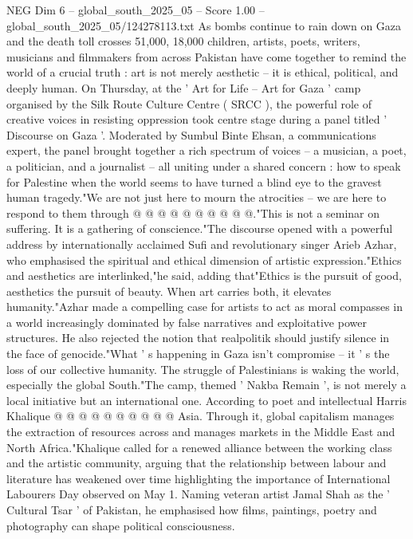 \begin{textsample}{NEG Dim 6 – global\_south\_2025\_05 – Score 1.00 – global\_south\_2025\_05/124278113.txt}  \label{ex:f6_neg_395}
As bombs continue to rain down on Gaza and the death toll crosses 51,000, 18,000 children, artists, poets, writers, musicians and filmmakers from across Pakistan have come together to remind the world of a crucial truth : art is not merely aesthetic -- it is ethical, political, and deeply human.
On Thursday, at the ' Art for Life -- Art for Gaza ' camp organised by the Silk Route Culture Centre ( SRCC ), the powerful role of creative voices in resisting oppression took centre stage during a panel titled ' Discourse on Gaza '.
Moderated by Sumbul Binte Ehsan, a communications expert, the panel brought together a rich spectrum of voices -- a musician, a poet, a politician, and a journalist -- all uniting under a shared concern : how to speak for Palestine when the world seems to have turned a blind eye to the gravest human tragedy."We are not just here to mourn the atrocities -- we are here to respond to them through @ @ @ @ @ @ @ @ @ @."This is not a seminar on suffering.
It is a gathering of conscience."The discourse opened with a powerful address by internationally acclaimed Sufi and revolutionary singer Arieb Azhar, who emphasised the spiritual and ethical dimension of artistic expression."Ethics and aesthetics are interlinked,"he said, adding that"Ethics is the pursuit of good, aesthetics the pursuit of beauty.
When art carries both, it elevates humanity."Azhar made a compelling case for artists to act as moral compasses in a world increasingly dominated by false narratives and exploitative power structures.
He also rejected the notion that realpolitik should justify silence in the face of genocide."What ' s happening in Gaza isn't compromise -- it ' s the loss of our collective humanity.
The struggle of Palestinians is waking the world, especially the global South."The camp, themed ' Nakba Remain ', is not merely a local initiative but an international one.
According to poet and intellectual Harris Khalique @ @ @ @ @ @ @ @ @ @ Asia.
Through it, global capitalism manages the extraction of resources across and manages markets in the Middle East and North Africa."Khalique called for a renewed alliance between the working class and the artistic community, arguing that the relationship between labour and literature has weakened over time highlighting the importance of International Labourers Day observed on May 1.
Naming veteran artist Jamal Shah as the ' Cultural Tsar ' of Pakistan, he emphasised how films, paintings, poetry and photography can shape political consciousness.

\end{textsample}

